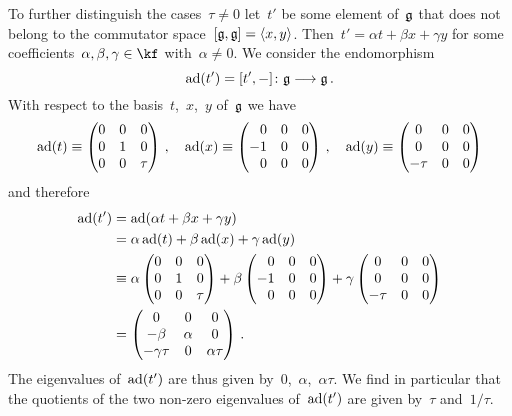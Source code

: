 \begin{example}
  To further distinguish the cases~$\tau \neq 0$ let~$t'$ be some element of~$\mathfrak{g}$ that does not belong to the commutator space~$[\mathfrak{g}, \mathfrak{g}] = \langle x,y\rangle$.
  Then~$t' = \alpha t + \beta x + \gamma y$ for some coefficients~$\alpha, \beta, \gamma \in \kf$ with~$\alpha \neq 0$.
  We consider the endomorphism
  \[
    \ad(t')
    =
    [t', -]
    \colon
    \glie
    \to
    \glie \,.
  \]
  With respect to the basis~$t$,~$x$,~$y$ of~$\mathfrak{g}$ we have
  \[
    \ad(t)
    \equiv
    \begin{pmatrix}
      0 & 0 & 0     \\
      0 & 1 & 0     \\
      0 & 0 & \tau
    \end{pmatrix} \,,
    \quad
    \ad(x)
    \equiv
    \begin{pmatrix*}[r]
       0  & 0 & 0 \\
      -1  & 0 & 0 \\
       0  & 0 & 0
    \end{pmatrix*} \,,
    \quad
    \ad(y)
    \equiv
    \begin{pmatrix}
      0     & 0 & 0 \\
      0     & 0 & 0 \\
      -\tau & 0 & 0
    \end{pmatrix}
  \]
  and therefore
  \begin{align*}
    \ad(t')
    &=
    \ad(\alpha t + \beta x + \gamma y)
    \\
    &=
    \alpha \ad(t) + \beta \ad(x) + \gamma \ad(y)
    \\
    &\equiv
    \alpha
    \begin{pmatrix}
      0 & 0 & 0     \\
      0 & 1 & 0     \\
      0 & 0 & \tau
    \end{pmatrix}
    +
    \beta
    \begin{pmatrix*}[r]
       0  & 0 & 0 \\
      -1  & 0 & 0 \\
       0  & 0 & 0
    \end{pmatrix*}
    +
    \gamma
    \begin{pmatrix}
      0     & 0 & 0 \\
      0     & 0 & 0 \\
      -\tau & 0 & 0
    \end{pmatrix}
    \\
    &=
    \begin{pmatrix}
       0          & 0       & 0           \\
      -\beta      & \alpha  & 0           \\
      -\gamma\tau & 0       & \alpha \tau
    \end{pmatrix} \,.
  \end{align*}
  The eigenvalues of~$\operatorname{ad}(t')$ are thus given by~$0$,~$\alpha$,~$\alpha \tau$.
  We find in particular that the quotients of the two non-zero eigenvalues of~$\operatorname{ad}(t')$ are given by~$\tau$ and~$1 / \tau$.


\end{example}
